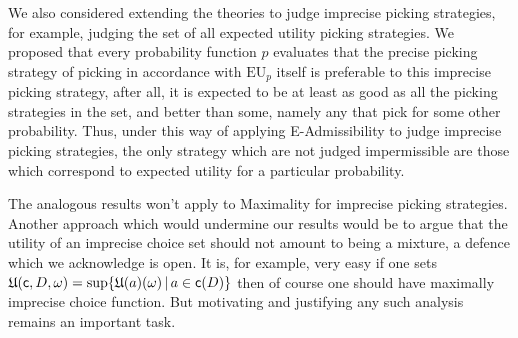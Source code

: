 \documentclass[a4paper]{article}
\newcommand\EU{\mathrm{EU}}
\newcommand\U{\mathfrak{U}} %
\renewcommand\c{\mathsf{c}} %
\newcommand{\todoold}[2][]{\todo[backgroundcolor=white,bordercolor=orange!10,linecolor=gray!10, #1,caption={},textcolor=gray]{Pre-rev: #2}}
\newcommand{\todooldinfo}[2][]{\todoold[#1]{#2}}
\renewcommand{\color}[1]{}
\newcommand\SetDelimiter[1][]{
	\nonscript\,#1\vert \allowbreak \nonscript\,\mathopen{}}
\providecommand\given{\SetDelimiter}
\newenvironment{CCM rewritten}
{\begingroup\color{blue}} %
{\endgroup}              %
\begin{document}
	We also considered extending the theories to judge imprecise picking strategies, for example, judging the set of all expected utility picking strategies. We proposed that every probability function $p$ evaluates that the precise picking strategy of picking in accordance with $\EU_{p}$ itself is preferable to this imprecise picking strategy, after all, it is expected to be at least as good as all the picking strategies in the set, and better than some, namely any that pick for some other probability. Thus, under this way of applying E-Admissibility to judge imprecise picking strategies, the only strategy which are not judged impermissible are those which correspond to expected utility for a particular probability. \todooldinfo{ARGH!}

%
The analogous results won't apply to Maximality for imprecise picking strategies. 
Another approach which would undermine our results would be to argue that the utility of an imprecise choice set should not amount to being a mixture, a defence which we acknowledge is open. It is, for example, very easy if one sets $\U(\c,D,\omega)=\sup\{\U(a)(\omega)\given a\in\c(D)\}$ then of course one should have maximally imprecise choice function. But motivating and justifying any such analysis remains an important task. 
%
\end{document}
